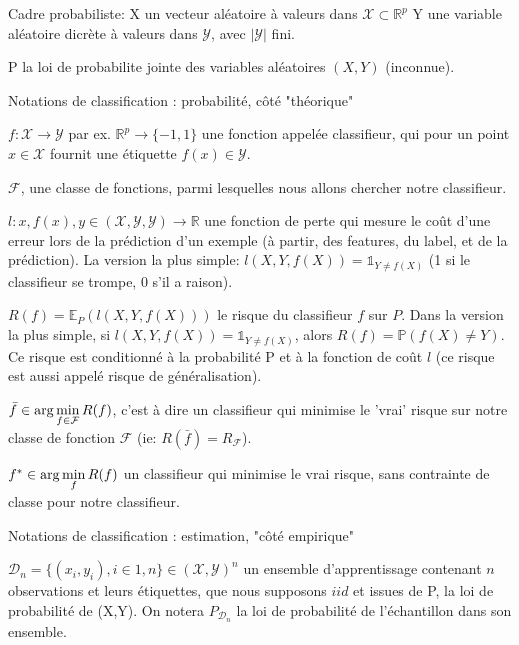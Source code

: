 \documentclass[a4paper]{article}
\theoremstyle{plain}
\begin{document}
\begin{outline}

\1 Cadre probabiliste:
\2 X un vecteur aléatoire à valeurs dans $\mathcal{X} \subset \mathbb{R}^p$
\2 Y une variable aléatoire dicrète à valeurs dans $\mathcal{Y} $, avec $|\mathcal{Y}|$ fini.


\2 P la loi de probabilite jointe des variables aléatoires $(X,Y)$ (inconnue).



\1 Notations de classification : probabilité, côté "théorique"

\2 $f: \mathcal{X} \rightarrow \mathcal{Y}$ par ex. $ \mathbb{R}^p \rightarrow \{-1,1\} $ une fonction appelée classifieur, qui pour un point $x \in \mathcal{X}$ fournit une étiquette  $f(x) \in \mathcal{Y}$.

\2 $\mathcal{F}$, une classe de fonctions, parmi lesquelles nous allons chercher notre classifieur.

\2 $ \mathit{l}: x, f(x), y \in (\mathcal{X}, \mathcal{Y}, \mathcal{Y}) \rightarrow \mathbb{R} $ une fonction de perte qui mesure le coût d’une erreur lors de la prédiction d’un exemple (à partir, des features, du label, et de la prédiction). La version la plus simple: $l(X,Y,f(X))= \mathds{1}_{Y\neq f(X)}$ (1 si le classifieur se trompe, 0 s'il a raison).

\2 $R(f)= \mathbb{E}_P(l(X,Y,f(X)))$ le risque du classifieur $f$ sur $P$. Dans la version la plus simple, si $l(X,Y,f(X))= \mathds{1}_{Y\neq f(X)}$, alors $R(f)= \mathbb{P}(f(X)\neq Y)$. Ce risque est conditionné à la probabilité P et à la fonction de coût $l$ (ce risque est aussi appelé risque de généralisation).
 
 \2 $\bar f \in {\rm arg} \displaystyle\min_{f \in \mathcal{F}} R(f) $, c'est à dire un classifieur qui minimise le 'vrai' risque sur notre classe de fonction $\mathcal{F}$ (ie: $R(\bar f) = R_{\mathcal{F}}$).

\2 $f^{\ast} \in {\rm arg} \displaystyle\min_{f} R(f) $ un classifieur qui minimise le vrai risque, sans contrainte de classe pour notre classifieur.

\1 Notations de classification : estimation, "côté empirique"

\2 $ \mathcal{D}_n = \{(x_i, y_i), i \in 1,n\} \in (\mathcal{X},\mathcal{Y})^n$ un ensemble d’apprentissage contenant $n$ observations et leurs étiquettes, que nous supposons $iid$ et issues de P, la loi de probabilité de (X,Y). On notera $P_{\mathcal{D}_n}$ la loi de probabilité de l'échantillon dans son ensemble.



\end{outline}
\end{document}
